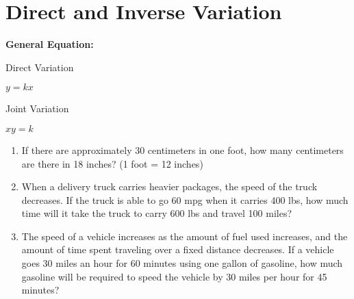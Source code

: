 \section[Variation]{Direct and Inverse Variation}

\bigskip
\textbf{General Equation:} 

\begin{center}
\setlength{\columnseprule}{0pt}
\begin{multicols}{2}
Direct Variation

$y=kx$

\columnbreak
Joint Variation

$xy=k$
\end{multicols}
\end{center}

\vfill
\begin{enumerate}[labelindent=*,style=multiline,leftmargin=*,label=\textbf{Example \arabic*:}]
\item If there are approximately 30 centimeters in one foot, how many centimeters are there in 18 inches? (1 foot = 12 inches)

\vfill
\item When a delivery truck carries heavier packages, the speed of the truck decreases. If the truck is able to go 60 mpg when it carries 400 lbs, how much time will it take the truck to carry 600 lbs and travel 100 miles?

\vfill
\item The speed of a vehicle increases as the amount of fuel used increases, and the amount of time spent traveling over a fixed distance decreases. If a vehicle goes 30 miles an hour for 60 minutes using one gallon of gasoline, how much gasoline will be required to speed the vehicle by 30 miles per hour for 45 minutes?
\end{enumerate}

